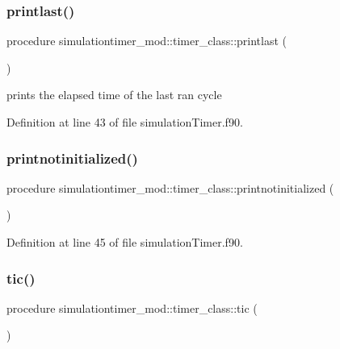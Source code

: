 \subsubsection{\texorpdfstring{printlast()}{printlast()}}
{\footnotesize\ttfamily procedure simulationtimer\+\_\+mod\+::timer\+\_\+class\+::printlast (\begin{DoxyParamCaption}{ }\end{DoxyParamCaption})\hspace{0.3cm}{\ttfamily [private]}}



prints the elapsed time of the last ran cycle 



Definition at line 43 of file simulation\+Timer.\+f90.

\mbox{\label{structsimulationtimer__mod_1_1timer__class_a559692fe52fabf6a4f5078b03ed08620}} 
\subsubsection{\texorpdfstring{printnotinitialized()}{printnotinitialized()}}
{\footnotesize\ttfamily procedure simulationtimer\+\_\+mod\+::timer\+\_\+class\+::printnotinitialized (\begin{DoxyParamCaption}{ }\end{DoxyParamCaption})\hspace{0.3cm}{\ttfamily [private]}}



Definition at line 45 of file simulation\+Timer.\+f90.

\mbox{\label{structsimulationtimer__mod_1_1timer__class_ab51b61f25cc929cb440d0b9ffd039b34}} 
\subsubsection{\texorpdfstring{tic()}{tic()}}
{\footnotesize\ttfamily procedure simulationtimer\+\_\+mod\+::timer\+\_\+class\+::tic (\begin{DoxyParamCaption}{ }\end{DoxyParamCaption})\hspace{0.3cm}{\ttfamily [private]}}



